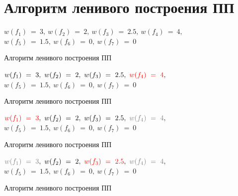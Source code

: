 \documentclass[utf8]{beamer}
\begin{document}
\section{Алгоритм ленивого построения ПП}

\begin{frame}
	\begin{exampleblock}{}
		\begin{center} 
				$w(f_1)\ =\ 3,\ w(f_2)\ =\ 2,\ w(f_3)\ =\ 2.5,\ w(f_4)\
				=\ 4,$ \\$w(f_5)\ =\ 1.5,\ w(f_6)\ =\ 0,\ w(f_7)\ =\ 0$
		\end{center}  
	\end{exampleblock}
	\begin{block}{Алгоритм ленивого построения ПП}
		\picLazyCFirst                 
	\end{block}
\end{frame}

\begin{frame}
	\begin{exampleblock}{}
		\begin{center} 
				$w(f_1)\ =\ 3,\ w(f_2)\ =\ 2,\ w(f_3)\ =\ 2.5,\ {\color{red}w(f_4)\ 
				=\ 4},$ \\$w(f_5)\ =\ 1.5,\ w(f_6)\ =\ 0,\ w(f_7)\ =\ 0$
		\end{center}  
	\end{exampleblock}
	\begin{block}{Алгоритм ленивого построения ПП}
		\picLazyCSecond                 
	\end{block}
\end{frame}

\begin{frame}
	\begin{exampleblock}{}
		\begin{center} 
				${\color{red}w(f_1)\ =\ 3},
				\ w(f_2)\ =\ 2,\ w(f_3)\ =\ 2.5,\
				{\color{gray}w(f_4)\ =\ 4},$ \\$w(f_5)\ =\ 1.5,\ w(f_6)\ =\ 0,\ w(f_7)\ =\
				0$
		\end{center}  
	\end{exampleblock}
	\begin{block}{Алгоритм ленивого построения ПП}
		\picLazyCThird                 
	\end{block}
\end{frame}

\begin{frame}
	\begin{exampleblock}{}
		\begin{center} 
				${\color{gray}w(f_1)\ =\ 3},\ w(f_2)\ =\ 2,\ {\color{red}w(f_3)\ =\ 2.5},\
				{\color{gray}w(f_4)\ =\ 4},$ \\$w(f_5)\ =\ 1.5,\ w(f_6)\ =\ 0,\ w(f_7)\ =\
				0$
		\end{center}  
	\end{exampleblock}
	\begin{block}{Алгоритм ленивого построения ПП}
		\picLazyCForth                 
	\end{block}
\end{frame}
\end{document}
